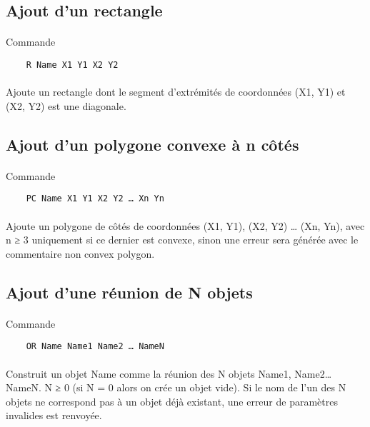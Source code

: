 \documentclass[a4paper, 12pts]{article}
\begin{document}
\subsection{Ajout d'un rectangle}
 \paragraph{}
Commande
\begin{lstlisting}
	R Name X1 Y1 X2 Y2
\end{lstlisting}
\paragraph{}
Ajoute un rectangle dont le segment d'extrémités de coordonnées (X1, Y1) et (X2, Y2) est une diagonale.

\subsection{Ajout d'un polygone convexe à n côtés}
 \paragraph{}
Commande
\begin{lstlisting}
	PC Name X1 Y1 X2 Y2 … Xn Yn
\end{lstlisting}
\paragraph{}
Ajoute un polygone de côtés de coordonnées (X1, Y1), (X2, Y2) … (Xn, Yn), avec n ≥ 3 uniquement si ce dernier est convexe, sinon une erreur sera générée avec le commentaire non convex polygon.

\subsection{Ajout d'une réunion de N objets}
 \paragraph{}
Commande
\begin{lstlisting}
	OR Name Name1 Name2 … NameN
\end{lstlisting}
\paragraph{}
Construit un objet Name comme la réunion des N objets Name1, Name2… NameN. N ≥ 0 (si N = 0 alors on crée un objet vide). Si le nom de l'un des N objets ne correspond pas à un objet déjà existant, une erreur de paramètres invalides est renvoyée.
\end{document}
